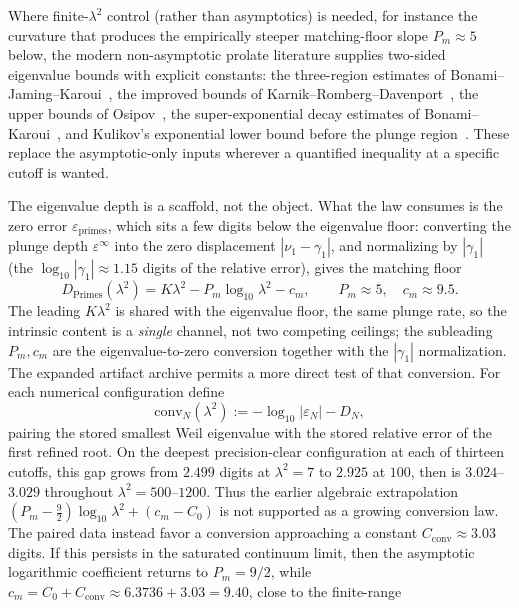 \documentclass[11pt,a4paper]{article}
\begin{document}
Where finite-$\lambda^2$ control (rather than asymptotics) is needed, for
instance the curvature that produces the empirically steeper matching-floor
slope $P_m\approx5$ below, the modern non-asymptotic prolate literature
supplies two-sided eigenvalue bounds with explicit constants: the
three-region estimates of Bonami--Jaming--Karoui~\cite{BJK2021}, the improved
bounds of Karnik--Romberg--Davenport~\cite{KRD2021}, the upper bounds of
Osipov~\cite{Osipov2013}, the super-exponential decay estimates of
Bonami--Karoui~\cite{BonamiKaroui2017}, and Kulikov's exponential lower bound
before the plunge region~\cite{Kulikov2023}. These replace the
asymptotic-only inputs wherever a quantified inequality at a specific cutoff
is wanted.

The eigenvalue depth is a scaffold, not the object. What the law consumes is the
zero error $\varepsilon_{\mathrm{primes}}$, which sits a few digits below the
eigenvalue floor: converting the plunge depth $\varepsilon^\infty$ into the zero
displacement $|\nu_1-\gamma_1|$, and normalizing by $|\gamma_1|$ (the
$\log_{10}|\gamma_1|\approx1.15$ digits of the relative error), gives the matching
floor
\begin{equation}\label{eq:primes}
  D_{\mathrm{Primes}}(\lambda^2)=K\lambda^2-P_m\log_{10}\lambda^2-c_m,
  \qquad P_m\approx5,\quad c_m\approx9.5.
\end{equation}
The leading $K\lambda^2$ is shared with the eigenvalue floor, the same plunge
rate, so the intrinsic content is a \emph{single} channel, not two competing
ceilings; the subleading $P_m,c_m$ are the eigenvalue-to-zero conversion together
with the $|\gamma_1|$ normalization. The expanded artifact archive permits a
more direct test of that conversion. For each numerical configuration define
\[
  \mathrm{conv}_N(\lambda^2):=
  -\log_{10}|\varepsilon_N|-D_N,
\]
pairing the stored smallest Weil eigenvalue with the stored relative error of
the first refined root. On the deepest precision-clear configuration at each
of thirteen cutoffs, this gap grows from $2.499$ digits at $\lambda^2=7$ to
$2.925$ at $100$, then is $3.024$--$3.029$ throughout
$\lambda^2=500$--$1200$. Thus the earlier algebraic extrapolation
$(P_m-\tfrac92)\log_{10}\lambda^2+(c_m-C_0)$ is not supported as a growing
conversion law. The paired data instead favor a conversion approaching a
constant $C_{\mathrm{conv}}\approx3.03$ digits. If this persists in the
saturated continuum limit, then the asymptotic logarithmic coefficient returns
to $P_m=9/2$, while
$c_m=C_0+C_{\mathrm{conv}}\approx6.3736+3.03=9.40$, close to the finite-range
\end{document}

